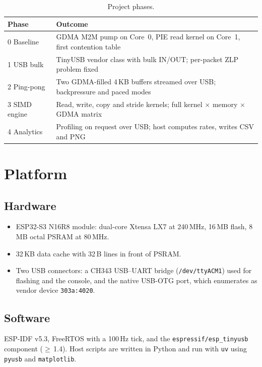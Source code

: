 \documentclass[11pt,a4paper]{article}
\begin{document}
\begin{table}[h]
\centering
\begin{tabularx}{\linewidth}{@{}lX@{}}
\toprule
Phase & Outcome \\
\midrule
0 Baseline & GDMA M2M pump on Core~0, PIE read kernel on Core~1, first contention table \\
1 USB bulk & TinyUSB vendor class with bulk IN/OUT; per-packet ZLP problem fixed \\
2 Ping-pong & Two GDMA-filled 4\,KB buffers streamed over USB; backpressure and paced modes \\
3 SIMD engine & Read, write, copy and stride kernels; full kernel $\times$ memory $\times$ GDMA matrix \\
4 Analytics & Profiling on request over USB; host computes rates, writes CSV and PNG \\
\bottomrule
\end{tabularx}
\caption{Project phases.}
\label{tab:phases}
\end{table}

\section{Platform}
\subsection{Hardware}
\begin{itemize}
  \item ESP32-S3 N16R8 module: dual-core Xtensa LX7 at 240\,MHz, 16\,MB flash, 8\,MB octal PSRAM at 80\,MHz.
  \item 32\,KB data cache with 32\,B lines in front of PSRAM.
  \item Two USB connectors: a CH343 USB--UART bridge (\texttt{/dev/ttyACM1}) used for flashing and
        the console, and the native USB-OTG port, which enumerates as vendor device \texttt{303a:4020}.
\end{itemize}

\subsection{Software}
ESP-IDF v5.3, FreeRTOS with a 100\,Hz tick, and the \texttt{espressif/esp\_tinyusb} component
($\geq$\,1.4). Host scripts are written in Python and run with \texttt{uv} using \texttt{pyusb}
and \texttt{matplotlib}.
\end{document}
